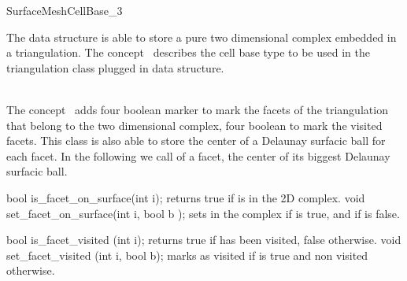 

\begin{ccRefConcept}{SurfaceMeshCellBase_3}


\ccDefinition
  
The  data structure is able to store
a pure two dimensional complex embedded in a triangulation.
The concept \ccRefName\ describes the cell base type
to be used  in the  triangulation class    plugged in 
 data structure.


\ccGeneralizes
{} \\
The concept \ccRefName\ adds four boolean marker to mark the facets
of the triangulation that belong to the two dimensional complex,
four boolean to mark the visited facets.
This class is also able to store the center of a Delaunay surfacic
ball for each facet.  In the following we call 
of a facet, the center of its biggest Delaunay surfacic ball.

\ccTypes


\ccCreation
{}  %



\ccOperations

\ccMethod
{bool is_facet_on_surface(int i);}
{returns true if  is in the 2D complex. }
\ccGlue
\ccMethod
{void set_facet_on_surface(int i, bool b );}
{sets  in the complex if  is true,
and  if  is false.}


\ccMethod
{bool is_facet_visited (int i);}
{returns true if  has been visited,
false otherwise.}
\ccGlue
\ccMethod
{void set_facet_visited (int i, bool b);} 
{marks  as visited if  is true
 and non visited otherwise.}



\end{ccRefConcept}
